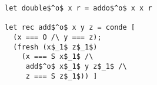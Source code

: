 \begin{figure}[!t]
  \centering
  \begin{minipage}{\columnwidth}
    \begin{lstlisting}[label={double},
                       caption={Doubling and addition relations},
                       captionpos=b,
                       frame=tb]
let double$^o$ x r = addo$^o$ x x r

let rec add$^o$ x y z = conde [
  (x === O /\ y === z);
  (fresh (x$_1$ z$_1$)
    (x === S x$_1$ /\
     add$^o$ x$_1$ y z$_1$ /\
     z === S z$_1$)) ]
    \end{lstlisting}
  \end{minipage}
\end{figure}